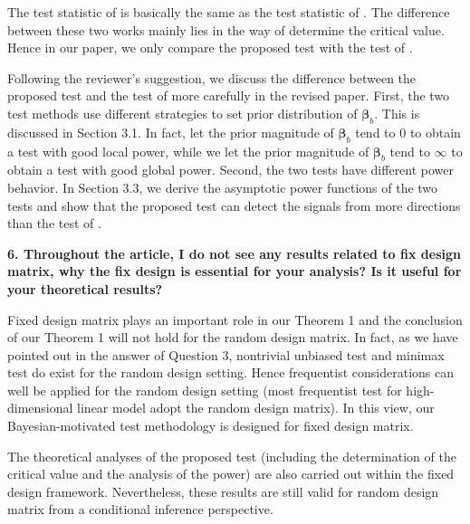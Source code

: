 \documentclass[11pt]{article}
\newcommand{\bfsym}[1]{\ensuremath{\boldsymbol{#1}}}
\def\bbeta{\bfsym \beta}
\theoremstyle{plain}
\theoremstyle{definition}
\theoremstyle{remark}
\begin{document}
The test statistic of \cite{Lan2014Testing} is basically the same as the test statistic of \cite{Goeman2006}.
The difference between these two works mainly lies in the way of determine the critical value.
Hence in our paper, we only compare the proposed test with the test of \cite{Goeman2006}.

Following the reviewer's suggestion, we discuss the difference between the proposed test and the test of \cite{Goeman2006} more carefully in the revised paper.
First, the two test methods use different strategies to set prior distribution of $\bbeta_b$.
This is discussed in Section 3.1.
In fact, \cite{Goeman2006} let the prior magnitude of $\bbeta_b$ tend to $0$ to obtain a test with good local power,
while we let the prior magnitude of $\bbeta_b$ tend to $\infty$ to obtain a test with good global power.
Second, the two tests have different power behavior.
In Section 3.3, we derive the asymptotic power functions of the two tests and show that the proposed test can detect the signals from more directions than the test of \cite{Goeman2006}.

\textbf{
    6. Throughout the article, I do not see any results related to fix design matrix, why the fix design is essential for your analysis?
    Is it useful for your theoretical results?
}

Fixed design matrix plays an important role in our Theorem 1 and the conclusion of our Theorem 1 will not hold for the random design matrix.
In fact, as we have pointed out in the answer of Question 3, nontrivial unbiased test and minimax test do exist for the random design setting.
Hence frequentist considerations can well be applied for the random design setting (most frequentist test for high-dimensional linear model adopt the random design matrix).
In this view, our Bayesian-motivated test methodology is designed for fixed design matrix.

The theoretical analyses of the proposed test (including the determination of the critical value and the analysis of the power) are also carried out within the fixed design framework.
Nevertheless, these results are still valid for random design matrix from a conditional inference perspective.
\end{document}

